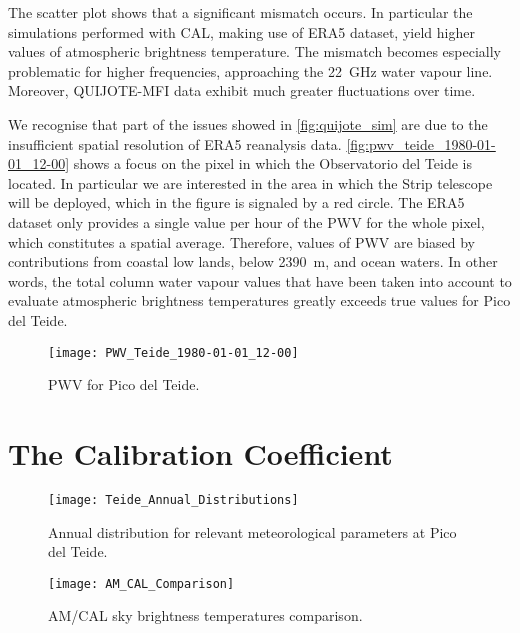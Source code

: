 The scatter plot shows that a significant mismatch occurs. In particular
the simulations performed with CAL, making use of ERA5 dataset, yield higher
values of atmospheric brightness temperature. The mismatch becomes
especially problematic for higher frequencies, approaching the
\SI{22}{\giga\hertz} water vapour line. Moreover, QUIJOTE-MFI data
exhibit much greater fluctuations over time.

We recognise that part of the issues showed in \autoref{fig:quijote_sim}
are due to the insufficient spatial resolution of ERA5 reanalysis data.
\autoref{fig:pwv_teide_1980-01-01_12-00} shows a focus on the pixel in
which the Observatorio del Teide is located. In particular we are
interested in the area in which the Strip telescope will be deployed, which
in the figure is signaled by a red circle. The ERA5 dataset only provides a
single value per hour of the PWV for the whole pixel, which constitutes a
spatial average.  Therefore, values of PWV are biased by contributions from
coastal low lands, below \SI{2390}{\meter}, and ocean waters. In other
words, the total column water vapour values that have been taken into
account to evaluate atmospheric brightness temperatures greatly exceeds
true values for Pico del Teide.

\begin{figure}
        \centering
        \texttt{[image: PWV\_Teide\_1980-01-01\_12-00]}
        \caption{PWV for Pico del Teide.}
        \label{fig:pwv_teide_1980-01-01_12-00}
\end{figure}

\section{The Calibration Coefficient}

\begin{figure}
        \centering
        \texttt{[image: Teide\_Annual\_Distributions]}
        \caption{Annual distribution for relevant meteorological parameters
        at Pico del Teide.}
        \label{fig:teide_annual_distributions}
\end{figure}

\begin{figure}
        \centering
        \texttt{[image: AM\_CAL\_Comparison]}
        \caption{AM/CAL sky brightness temperatures comparison.}
        \label{fig:am_cal_comparison}
\end{figure}

